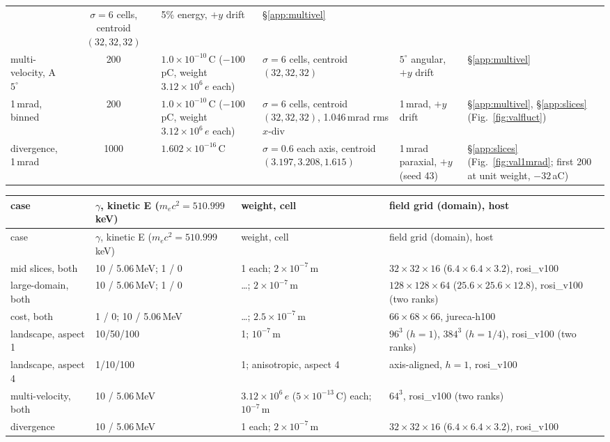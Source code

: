 \begin{longtable}{@{}p{1.9cm}cp{2.2cm}p{2.7cm}p{2.7cm}p{2.7cm}@{}}
    & $\sigma\!=\!6$ cells, centroid $(32,32,32)$
    & 5\% energy, $+y$ drift
    & \S\ref{app:multivel} \\
 multi-velocity, A $5^\circ$ & 200 & $1.0\times10^{-10}$\,C ($-100$\,pC, weight $3.12\times10^{6}\,e$ each)
    & $\sigma\!=\!6$ cells, centroid $(32,32,32)$
    & $5^\circ$ angular, $+y$ drift
    & \S\ref{app:multivel} \\
  1\,mrad, binned & 200 & $1.0\times10^{-10}$\,C ($-100$\,pC, weight $3.12\times10^{6}\,e$ each)
     & $\sigma\!=\!6$ cells, centroid $(32,32,32)$, 1.046\,mrad rms $x$-div
     & 1\,mrad, $+y$ drift
     & \S\ref{app:multivel}, \S\ref{app:slices} (Fig.~\ref{fig:valfluct}) \\
  divergence, 1\,mrad & 1000 & $1.602\times10^{-16}$\,C
     & $\sigma\!=\!0.6$ each axis, centroid $(3.197,3.208,1.615)$
      & 1\,mrad paraxial, $+y$ (seed 43)
     & \S\ref{app:slices} (Fig.~\ref{fig:val1mrad}; first 200 at unit weight, $-32$\,aC) \\
\end{longtable}

\begin{longtable}{@{}p{2.3cm}p{3.4cm}p{4.5cm}p{4.4cm}@{}}
\toprule
case & $\gamma$, kinetic E ($m_ec^2\!=\!510.999$\,keV) & weight, cell & field grid (domain), host \\
\midrule
\endfirsthead
\toprule
case & $\gamma$, kinetic E ($m_ec^2\!=\!510.999$\,keV) & weight, cell & field grid (domain), host \\
\midrule
\endhead
\bottomrule
\endfoot
mid slices, both & 10 / 5.06\,MeV; 1 / 0 & 1 each; $2\times10^{-7}$\,m & $32\times32\times16$ ($6.4\times6.4\times3.2$), rosi\_v100 \\
large-domain, both & 10 / 5.06\,MeV; 1 / 0 & \dots; $2\times10^{-7}$\,m & $128\times128\times64$ ($25.6\times25.6\times12.8$), rosi\_v100 (two ranks) \\
cost, both & 1 / 0; 10 / 5.06\,MeV & \dots; $2.5\times10^{-7}$\,m & $66\times68\times66$, jureca-h100 \\
landscape, aspect 1 & 10/50/100 & 1; $10^{-7}$\,m & $96^3$ ($h\!=\!1$), $384^3$ ($h\!=\!1/4$), rosi\_v100 (two ranks) \\
landscape, aspect 4 & 1/10/100 & 1; anisotropic, aspect 4 & axis-aligned, $h\!=\!1$, rosi\_v100 \\
 multi-velocity, both & 10 / 5.06\,MeV & $3.12\times10^{6}\,e$ ($5\times10^{-13}$\,C) each; $10^{-7}$\,m & $64^3$, rosi\_v100 (two ranks) \\
 divergence & 10 / 5.06\,MeV & 1 each; $2\times10^{-7}$\,m & $32\times32\times16$ ($6.4\times6.4\times3.2$), rosi\_v100 \\
\end{longtable}
\endgroup

